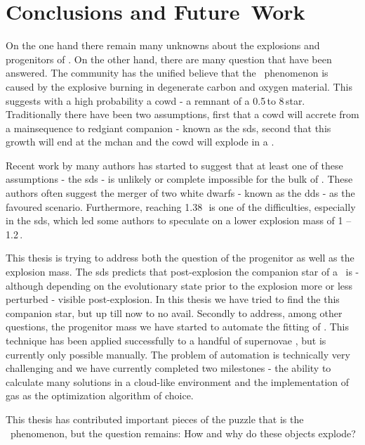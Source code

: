\chapter{Conclusions and Future~Work}
\label{chap:conclusion}

On the one hand there remain many unknowns about the explosions and progenitors of \sneia. On the other hand, there are many question that have been answered. The community has the unified believe that the \snia\ phenomenon is caused by the explosive burning in degenerate carbon and oxygen material. This suggests with a high probability a \gls{cowd} - a remnant of a 0.5\,\msun to 8\,\msun star. Traditionally there have been two assumptions, first that a \gls{cowd} will accrete from a \gls{mainsequence} to \gls{redgiant} companion - known as the \gls{sds}, second that this growth will end at the \gls{mchan} and the \gls{cowd} will explode in a \snia. 

Recent work by many authors \citep[e.g.][]{2011arXiv1106.4008B, 2010ApJ...722.1691H, 2010MNRAS.407.1314M} has started to suggest that at least one of these assumptions - the \gls{sds} - is unlikely or complete impossible for the bulk of \sneia. These authors often suggest the merger of two white dwarfs - known as the \gls{dds} - as the favoured scenario. Furthermore, reaching 1.38\,\msun\ is one of the difficulties, especially in the \gls{sds}, which led some authors to speculate on a lower explosion mass of 1 -- 1.2\,\msun \citep[e.g.][]{2010ApJ...714L..52S}. 

This thesis is trying to address both the question of the progenitor as well as the explosion mass. The \gls{sds} predicts that post-explosion the companion star of a \snia\ is - although depending on the evolutionary state prior to the explosion more or less perturbed - visible post-explosion. In this thesis we have tried to find the this companion star, but up till now to no avail. 
Secondly to address, among other questions, the progenitor mass we have started to automate the fitting of \snia. This technique has been applied successfully to a handful of supernovae \citep{2007Sci...315..825M}, but is currently only possible manually. The problem of automation is technically very challenging and we have currently completed two milestones - the ability to calculate many solutions in a cloud-like environment and the implementation of \glspl{ga} as the optimization algorithm of choice. 

This thesis has contributed important pieces of the puzzle that is the \snia\ phenomenon, but the question remains: How and why do these objects explode?

